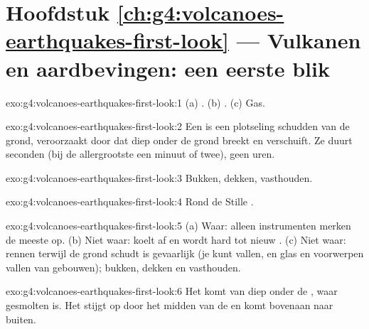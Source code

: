 \section*{Hoofdstuk \ref{ch:g4:volcanoes-earthquakes-first-look} --- Vulkanen en aardbevingen: een eerste blik}

\begin{solution}{exo:g4:volcanoes-earthquakes-first-look:1}
(a) . (b) . (c) Gas.
\end{solution}

\begin{solution}{exo:g4:volcanoes-earthquakes-first-look:2}
Een  is een plotseling schudden van de grond, veroorzaakt door
 dat diep onder de grond breekt en verschuift. Ze duurt seconden
(bij de allergrootste een minuut of twee), geen uren.
\end{solution}

\begin{solution}{exo:g4:volcanoes-earthquakes-first-look:3}
Bukken, dekken, vasthouden.
\end{solution}

\begin{solution}{exo:g4:volcanoes-earthquakes-first-look:4}
Rond de Stille .
\end{solution}

\begin{solution}{exo:g4:volcanoes-earthquakes-first-look:5}
(a) Waar: alleen instrumenten merken de meeste op. (b) Niet waar: 
koelt af en wordt hard tot nieuw . (c) Niet waar: rennen terwijl
de grond schudt is gevaarlijk (je kunt vallen, en glas en voorwerpen vallen
van gebouwen); bukken, dekken en vasthouden.
\end{solution}

\begin{solution}{exo:g4:volcanoes-earthquakes-first-look:6}
Het komt van diep onder de , waar  gesmolten is. Het stijgt
op door het midden van de  en komt bovenaan naar buiten.
\end{solution}

